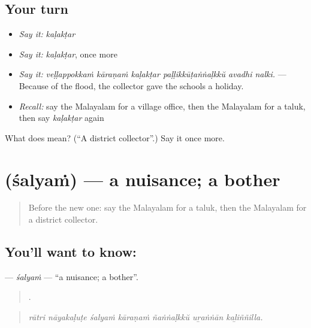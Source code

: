 \subsection*{Your turn}
\begin{itemize}
\raggedright
  \item \emph{Say it:} \emph{kaḷakṭar}
  \item \emph{Say it:} \emph{kaḷakṭar}, once more
  \item \emph{Say it:} \emph{veḷḷappokkaṁ kāraṇaṁ kaḷakṭar paḷḷikkūṭaṅṅaḷkkŭ avadhi nalki.} — Because of the flood, the collector gave the schools a holiday.
  \item \emph{Recall:} say the Malayalam for a village office, then the Malayalam for a taluk, then say \emph{kaḷakṭar} again
\end{itemize}

\begin{tcolorbox}[breakable,colback=teal!4,colframe=teal!35!black,title={Before you move on}]
What does  mean? (\textquotedblleft{}A district collector\textquotedblright{}.) Say it once more.
\end{tcolorbox}
\section[\texorpdfstring{\ml{ശല്യം} (śalyaṁ)}{ശല്യം (śalyaṁ)}]{ (śalyaṁ) — a nuisance; a bother}

\label{lesson:ML-C487-salyam}



\begin{quote}
Before the new one: say the Malayalam for a taluk, then the Malayalam for a district collector.
\end{quote}

\subsection*{You'll want to know: }
\textbf{} — \emph{śalyaṁ} — \textquotedblleft{}a nuisance; a bother\textquotedblright{}.

\begin{quote}
      .
\end{quote}

\begin{quote}
\emph{rātri nāyakaḷuṭe śalyaṁ kāraṇaṁ ñaṅṅaḷkkŭ uṟaṅṅān kaḻiññilla.}
\end{quote}

